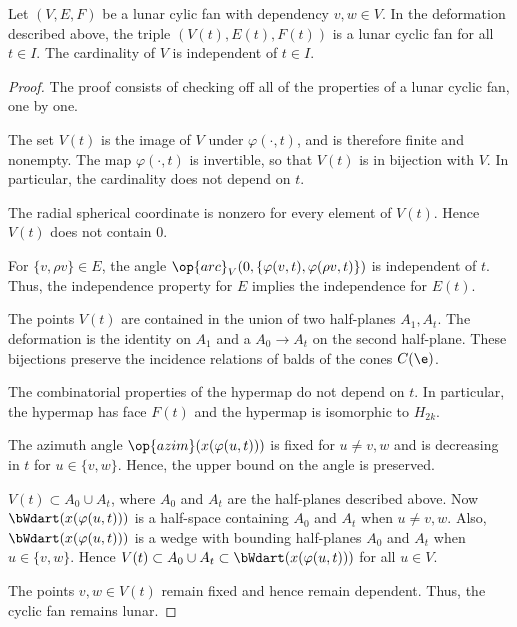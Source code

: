 \begin{lemma}\label{lemma:lunar-deform} 
Let $(V,E,F)$ be a lunar cylic fan with dependency $v,w\in V$.  In the deformation described above, the triple $(V(t),E(t),F(t))$ is a lunar cyclic fan for all $t\in I$.  The cardinality of $V$ is independent of $t\in I$.
\end{lemma}

\begin{proof}  The proof consists of checking off all of the properties of a lunar cyclic fan, one by one.  

 The set $V(t)$ is the image of $V$ under $\varphi(\cdot,t)$, and is therefore finite and nonempty.  The map $\varphi(\cdot,t)$ is invertible, so that $V(t)$ is in bijection with $V$.  In particular, the cardinality does not depend on $t$.

 The radial spherical coordinate is nonzero for every element of $V(t)$.  Hence $V(t)$ does not contain $0$.

  For $\{v,\rho v\}\in E$, the angle 
$\op{arc}_V(0,\{\varphi(v,t),\varphi(\rho v,t)\})$
is independent of $t$.  Thus, the independence property for $E$ implies
the independence for $E(t)$.

 The points $V(t)$ are contained in the union of two half-planes $A_1,A_t$.  The deformation is the identity on $A_1$ and a $A_0\to A_t$ on the second half-plane.  These bijections preserve the incidence relations of balds of the cones $C(\e)$.  

 The combinatorial properties of the hypermap do not depend on $t$.  In particular, the hypermap has face $F(t)$ and the hypermap is isomorphic to $H_{2k}$.

 The azimuth angle $\op{azim}(x(\varphi(u,t)))$ is fixed for $u\ne v,w$ and is decreasing in $t$ for $u\in \{v,w\}$.  Hence, the upper bound on the angle is preserved.

  $V(t)\subset A_0\cup A_t$, where $A_0$ and $A_t$ are the
half-planes described above.  Now $\bWdart(x(\varphi(u,t)))$ is a half-space containing $A_0$ and $A_t$ when $u\ne v,w$.  Also, $\bWdart(x(\varphi(u,t)))$ is a wedge with bounding half-planes $A_0$ and $A_t$ when $u\in \{v,w\}$.  Hence
$V(t)\subset A_0\cup A_t\subset \bWdart(x(\varphi(u,t)))$ for all $u\in V$.

 The points $v,w\in V(t)$ remain fixed and hence remain dependent.  Thus, the cyclic fan remains lunar.  
\end{proof}
%

